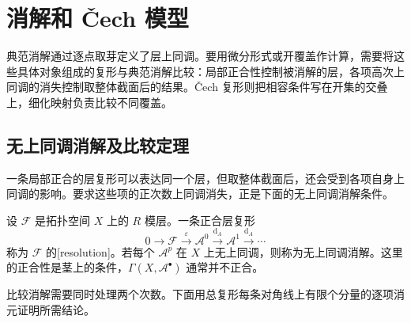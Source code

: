 
% 
% 

\section{消解和 Čech 模型}
\label{g2:sec:0702}

典范消解通过逐点取芽定义了层上同调。要用微分形式或开覆盖作计算，需要将这些具体对象组成的复形与典范消解比较：局部正合性控制被消解的层，各项高次上同调的消失控制取整体截面后的结果。Čech 复形则把相容条件写在开集的交叠上，细化映射负责比较不同覆盖。

\subsection{无上同调消解及比较定理}
\label{g2:subsec:0702:01}
一条局部正合的层复形可以表达同一个层，但取整体截面后，还会受到各项自身上同调的影响。要求这些项的正次数上同调消失，正是下面的无上同调消解条件。

\begin{definition}\label{g2:def:acyclic-resolution}
	设 \(\mathcal F\) 是拓扑空间 \(X\) 上的 \(R\) 模层。一条正合层复形
	\[
		0\longrightarrow\mathcal F\xrightarrow{\varepsilon}\mathcal A^0\xrightarrow{\mathrm d_A}\mathcal A^1\xrightarrow{\mathrm d_A}\cdots
	\]
	称为 \(\mathcal F\) 的[resolution]。若每个 \(\mathcal A^p\) 在 \(X\) 上无上同调，则称为无上同调消解。这里的正合性是茎上的条件，\(\Gamma(X,\mathcal A^\bullet)\) 通常并不正合。
\end{definition}

比较消解需要同时处理两个次数。下面用总复形每条对角线上有限个分量的逐项消元证明所需结论。

